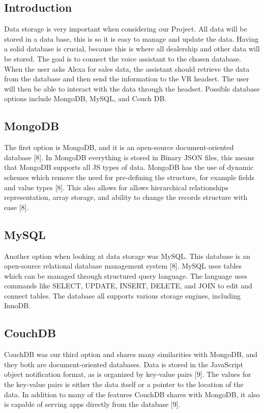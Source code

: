\documentclass[onecolumn, draftclsnofoot,10pt, compsoc]{IEEEtran}
\begin{document}
	\subsection{Introduction}
	
		Data storage is very important when considering our Project. All data will be stored in a data base, this is so it is easy to manage and update the data. Having a solid database is crucial, because this is where all dealership and other data will be stored. 
		The goal is to connect the voice assistant to the chosen database. When the user asks Alexa for sales data, the assistant should retrieve the data from the database and then send the information to the VR headset. The user will then be able to interact with 
		the data through the headset. Possible database options include MongoDB, MySQL, and Couch DB. 
	
	\subsection{MongoDB}
	
		The first option is MongoDB, and it is an open-source document-oriented database [8]. In MongoDB everything is stored in Binary JSON files, this means that MongoDB supports all JS types of data. MongoDB has the use of dynamic schemes which remove the need for
		pre-defining the structure, for example fields and value types [8]. This also allows for allows hierarchical relationships representation, array storage, and ability to change the records structure with ease [8].
		
	\subsection{MySQL}	
	
		Another option when looking at data storage was MySQL. This database is an open-source relational database management system [8]. MySQL uses tables which can be managed through structured query language. The language uses commands like SELECT, UPDATE, INSERT, DELETE,
		and JOIN to edit and connect tables. The database all supports various storage engines, including InnoDB. 
		
	\subsection{CouchDB}
	
		CouchDB was our third option and shares many similarities with MongoDB, and they both are document-oriented databases. Data is stored in the JavaScript object notification format, as is organized by key-value pairs [9]. The values for the key-value pairs is either the data 
		itself or a pointer to the location of the data. In addition to many of the features CouchDB shares with MongoDB, it also is capable of serving apps directly from the database [9].
	
\end{document}
